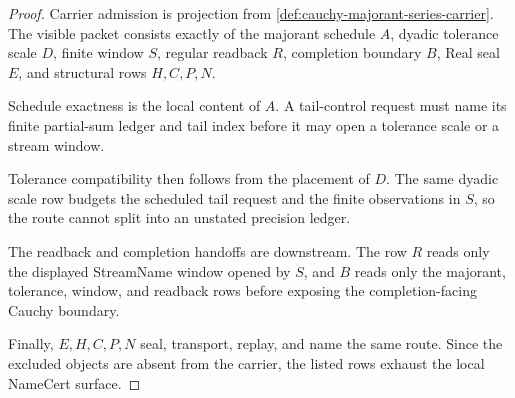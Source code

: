 \begin{proof}
Carrier admission is projection from \autoref{def:cauchy-majorant-series-carrier}. The visible packet consists exactly of the majorant schedule $A$, dyadic tolerance scale $D$, finite window $S$, regular readback $R$, completion boundary $B$, Real seal $E$, and structural rows $H,C,P,N$.

Schedule exactness is the local content of $A$. A tail-control request must name its finite partial-sum ledger and tail index before it may open a tolerance scale or a stream window.

Tolerance compatibility then follows from the placement of $D$. The same dyadic scale row budgets the scheduled tail request and the finite observations in $S$, so the route cannot split into an unstated precision ledger.

The readback and completion handoffs are downstream. The row $R$ reads only the displayed StreamName window opened by $S$, and $B$ reads only the majorant, tolerance, window, and readback rows before exposing the completion-facing Cauchy boundary.

Finally, $E,H,C,P,N$ seal, transport, replay, and name the same route. Since the excluded objects are absent from the carrier, the listed rows exhaust the local NameCert surface.
\end{proof}

